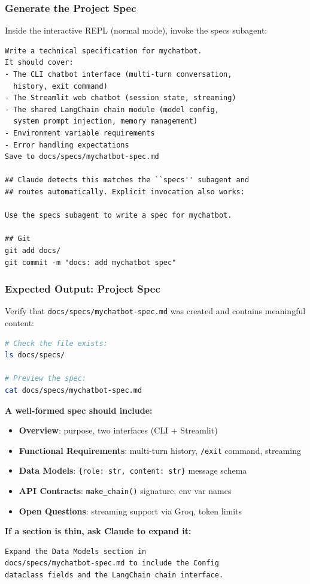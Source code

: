 \begin{frame}[fragile]\frametitle{Generate the Project Spec}
Inside the interactive REPL (normal mode), invoke the specs subagent:

\begin{lstlisting}
Write a technical specification for mychatbot.
It should cover:
- The CLI chatbot interface (multi-turn conversation,
  history, exit command)
- The Streamlit web chatbot (session state, streaming)
- The shared LangChain chain module (model config,
  system prompt injection, memory management)
- Environment variable requirements
- Error handling expectations
Save to docs/specs/mychatbot-spec.md

## Claude detects this matches the ``specs'' subagent and
## routes automatically. Explicit invocation also works:

Use the specs subagent to write a spec for mychatbot.

## Git
git add docs/
git commit -m "docs: add mychatbot spec"
\end{lstlisting}
\end{frame}


\begin{frame}[fragile]\frametitle{Expected Output: Project Spec}
Verify that \texttt{docs/specs/mychatbot-spec.md} was created and contains meaningful content:

\begin{lstlisting}[language=bash]
# Check the file exists:
ls docs/specs/

# Preview the spec:
cat docs/specs/mychatbot-spec.md
\end{lstlisting}

\textbf{A well-formed spec should include:}
  \begin{itemize}
    \item \textbf{Overview}: purpose, two interfaces (CLI + Streamlit)
    \item \textbf{Functional Requirements}: multi-turn history, \texttt{/exit} command, streaming
    \item \textbf{Data Models}: \texttt{\{role: str, content: str\}} message schema
    \item \textbf{API Contracts}: \texttt{make\_chain()} signature, env var names
    \item \textbf{Open Questions}: streaming support via Groq, token limits
  \end{itemize}

\textbf{If a section is thin, ask Claude to expand it:}
\begin{lstlisting}
Expand the Data Models section in
docs/specs/mychatbot-spec.md to include the Config
dataclass fields and the LangChain chain interface.
\end{lstlisting}
\end{frame}



